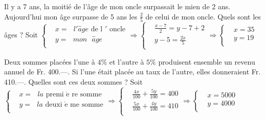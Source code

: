 \begin{solution}
Il y a 7 ans, la moitié de l’âge de mon oncle surpassait le mien de 2 ans. Aujourd’hui mon âge surpasse de 5 ans les $\frac{2}{5}$ de celui de mon oncle. Quels sont les âges ?
Soit $\left\{ \begin{array}{ll}
  & x=\text{ }l'\hat{a}ge\text{ de l }\!\!'\!\!\text{ oncle} \\ 
 & y=\text{ }mon\text{ }\hat{a}ge\text{ } \\ 
\end{array} \right.\Rightarrow \left\{ \begin{array}{ll}
  & \frac{x-7}{2}=y-7+2 \\ 
 & y-5=\frac{2x}{5} \\ 
\end{array} \right.\Rightarrow \left\{ \begin{array}{ll}
  & x=35 \\ 
 & y=19 \\ 
\end{array} \right.$
\end{solution}

\begin{solution}
Deux sommes placées l’une à $4 \%$ et l’autre à $5 \%$ produisent ensemble un revenu annuel de Fr. 400.—. Si l’une était placée au taux de l’autre, elles donneraient Fr. 410.—. Quelles sont ces deux sommes ?
Soit $\left\{ \begin{array}{ll}
  & x=\text{ }la\text{ premi }\!\!\grave{\mathrm{e}}\!\!\text{ re somme} \\ 
 & y=\text{ }la\text{ deuxi }\!\!\grave{\mathrm{e}}\!\!\text{ me somme} \\ 
\end{array} \right.\Rightarrow \left\{ \begin{array}{ll}
  & \frac{4x}{100}+\frac{5y}{100}=400 \\ 
 & \frac{5x}{100}+\frac{4y}{100}=410 \\ 
\end{array} \right.\Rightarrow \left\{ \begin{array}{ll}
  & x=5000 \\ 
 & y=4000 \\ 
\end{array} \right.$
\end{solution}

